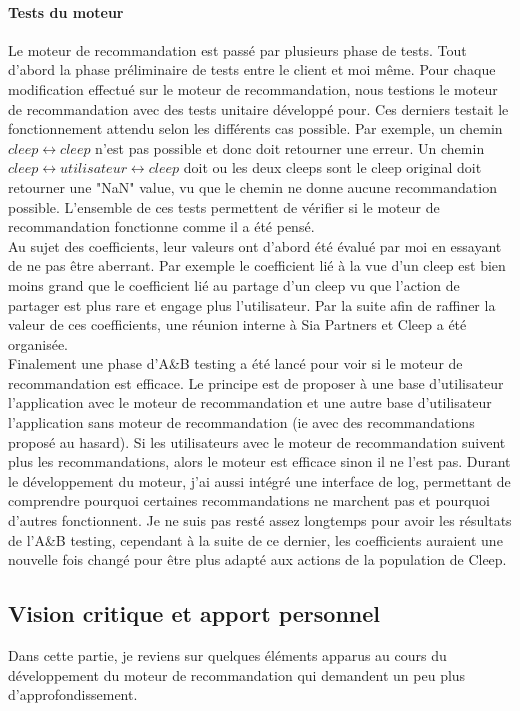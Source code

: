 \documentclass{article} %
\begin{document}
\paragraph{Tests du moteur\\}
Le moteur de recommandation est passé par plusieurs phase de tests. Tout d'abord la phase préliminaire de tests entre le client et moi même. Pour chaque modification effectué sur le moteur de recommandation, nous testions le moteur de recommandation avec des tests unitaire développé pour. Ces derniers testait le fonctionnement attendu selon les différents cas possible. Par exemple, un chemin $cleep \leftrightarrow cleep$ n'est pas possible et donc doit retourner une erreur. Un chemin $cleep \leftrightarrow utilisateur \leftrightarrow cleep$ doit ou les deux cleeps sont le cleep original doit retourner une "NaN" value, vu que le chemin ne donne aucune recommandation possible. L'ensemble de ces tests permettent de vérifier si le moteur de recommandation fonctionne comme il a été pensé.\\
Au sujet des coefficients, leur valeurs ont d'abord été évalué par moi en essayant de ne pas être aberrant. Par exemple le coefficient lié à la vue d'un cleep est bien moins grand que le coefficient lié au partage d'un cleep vu que l'action de partager est plus rare et engage plus l'utilisateur. Par la suite afin de raffiner la valeur de ces coefficients, une réunion interne à Sia Partners et Cleep a été organisée.\\
Finalement une phase d'A\&B testing a été lancé pour voir si le moteur de recommandation est efficace. Le principe est de proposer à une base d'utilisateur l'application avec le moteur de recommandation et une autre base d'utilisateur l'application sans moteur de recommandation (ie avec des recommandations proposé au hasard). Si les utilisateurs avec le moteur de recommandation suivent plus les recommandations, alors le moteur est efficace sinon il ne l'est pas. Durant le développement du moteur, j'ai aussi intégré une interface de log, permettant de comprendre pourquoi certaines recommandations ne marchent pas et pourquoi d'autres fonctionnent. Je ne suis pas resté assez longtemps pour avoir les résultats de l'A\&B testing, cependant à la suite de ce dernier, les coefficients auraient une nouvelle fois changé pour être plus adapté aux actions de la population de Cleep.

\subsection{Vision critique et apport personnel}
Dans cette partie, je reviens sur quelques éléments apparus au cours du développement du moteur de recommandation qui demandent un peu plus d'approfondissement.
\end{document}
